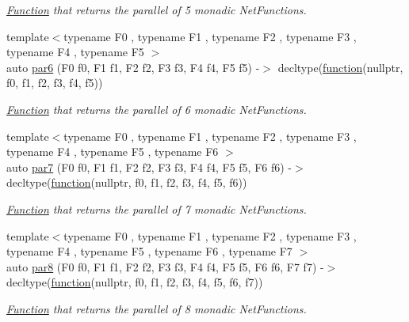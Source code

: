 \begin{DoxyCompactItemize}
\begin{DoxyCompactList}\small\item\em \hyperlink{structpfq_1_1lang_1_1Function}{Function} that returns the parallel of 5 monadic Net\+Functions. \end{DoxyCompactList}\item 
{\footnotesize template$<$typename F0 , typename F1 , typename F2 , typename F3 , typename F4 , typename F5 $>$ }\\auto \hyperlink{namespacepfq_1_1lang_1_1experimental_1_1anonymous__namespace_02experimental_8hpp_03_a5ee0cf3bbaf271ff2941397170aef439}{par6} (F0 f0, F1 f1, F2 f2, F3 f3, F4 f4, F5 f5) -\/$>$ decltype(\hyperlink{namespacepfq_1_1lang_a1a4638059d700ae08d0ca63886ff2bb3}{function}(nullptr, f0, f1, f2, f3, f4, f5))
\begin{DoxyCompactList}\small\item\em \hyperlink{structpfq_1_1lang_1_1Function}{Function} that returns the parallel of 6 monadic Net\+Functions. \end{DoxyCompactList}\item 
{\footnotesize template$<$typename F0 , typename F1 , typename F2 , typename F3 , typename F4 , typename F5 , typename F6 $>$ }\\auto \hyperlink{namespacepfq_1_1lang_1_1experimental_1_1anonymous__namespace_02experimental_8hpp_03_a6c8499b5c0716f01b69a4813e9a10a01}{par7} (F0 f0, F1 f1, F2 f2, F3 f3, F4 f4, F5 f5, F6 f6) -\/$>$ decltype(\hyperlink{namespacepfq_1_1lang_a1a4638059d700ae08d0ca63886ff2bb3}{function}(nullptr, f0, f1, f2, f3, f4, f5, f6))
\begin{DoxyCompactList}\small\item\em \hyperlink{structpfq_1_1lang_1_1Function}{Function} that returns the parallel of 7 monadic Net\+Functions. \end{DoxyCompactList}\item 
{\footnotesize template$<$typename F0 , typename F1 , typename F2 , typename F3 , typename F4 , typename F5 , typename F6 , typename F7 $>$ }\\auto \hyperlink{namespacepfq_1_1lang_1_1experimental_1_1anonymous__namespace_02experimental_8hpp_03_aa89f35d8e04819ca5414e4815cf0e6f9}{par8} (F0 f0, F1 f1, F2 f2, F3 f3, F4 f4, F5 f5, F6 f6, F7 f7) -\/$>$ decltype(\hyperlink{namespacepfq_1_1lang_a1a4638059d700ae08d0ca63886ff2bb3}{function}(nullptr, f0, f1, f2, f3, f4, f5, f6, f7))
\begin{DoxyCompactList}\small\item\em \hyperlink{structpfq_1_1lang_1_1Function}{Function} that returns the parallel of 8 monadic Net\+Functions. \end{DoxyCompactList}\end{DoxyCompactItemize}
